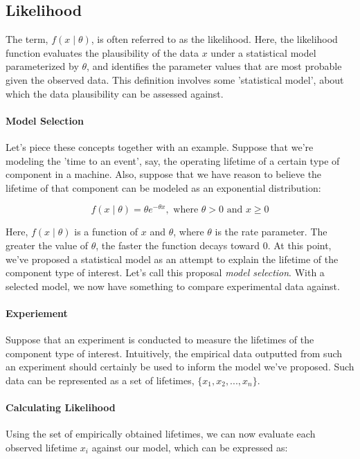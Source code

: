 \documentclass[12pt]{article}
\begin{document}
\subsection*{Likelihood}
\noindent The term, $f(x\mid\theta)$, is often referred to as the likelihood. Here, the likelihood function evaluates the plausibility of the data $x$ under a statistical model parameterized by $\theta$, and identifies the parameter values that are most probable given the observed data. This definition involves some 'statistical model', about which the data plausibility can be assessed against.

\paragraph{Model Selection}
Let's piece these concepts together with an example. Suppose that we're modeling the 'time to an event', say, the operating lifetime of a certain type of component in a machine. Also, suppose that we have reason to believe the lifetime of that component can be modeled as an exponential distribution:

\begin{equation}
f(x \mid \theta) = \theta e^{-\theta x}, \text{ where } \theta > 0 \text{ and } x \ge 0
\end{equation}

\noindent Here, $f(x \mid \theta)$ is a function of $x$ and $\theta$, where $\theta$ is the rate parameter. The greater the value of $\theta$, the faster the function decays toward 0. At this point, we've proposed a statistical model as an attempt to explain the lifetime of the component type of interest. Let's call this proposal \textit{model selection}. With a selected model, we now have something to compare experimental data against. 

\paragraph{Experiement}
Suppose that an experiment is conducted to measure the lifetimes of the component type of interest. Intuitively, the empirical data outputted from such an experiment should certainly be used to inform the model we've proposed. Such data can be represented as a set of lifetimes, $\{x_1, x_2, ..., x_n\}$. 

\newpage

\paragraph{Calculating Likelihood}
Using the set of empirically obtained lifetimes, we can now evaluate each observed lifetime $x_i$ against our model, which can be expressed as:
\end{document}
